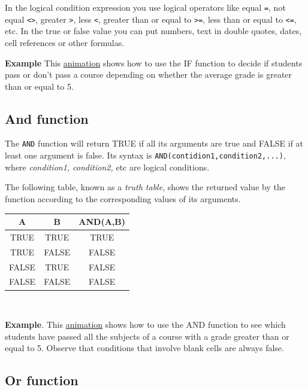 In the logical condition expression you use logical operators like equal \texttt{=}, not equal
\texttt{\textless{}\textgreater{}}, greater \texttt{\textgreater{}}, less \texttt{\textless{}}, greater than or equal to
\texttt{\textgreater{}=}, less than or equal to \texttt{\textless{}=}, etc. In the true or false value you can put
numbers, text in double quotes, dates, cell references or other formulas.

\textbf{Example} This \href{http://aprendeconalf.es/office/excel/manual/img/example_function_if.gif}{animation} shows how to use the IF function to decide if students pass or don't pass a course depending on whether the average grade is greater than or equal to 5.

\subsection{And function}\hypertarget{and-function}{}\label{and-function}

The \texttt{AND} function will return TRUE if all its arguments are true and FALSE if at least one argument is false. Its syntax is \texttt{AND(contidion1,condition2,...)}, where \emph{condition1, condition2,} etc are logical conditions.

The following table, known as a \emph{truth table}, shows the returned value by the function according to the corresponding values of its arguments.

\begin{longtable}{|c|c|c|}
\hline
A & B & AND(A,B)\\
\hline
TRUE & TRUE & TRUE\\
TRUE & FALSE & FALSE\\
FALSE & TRUE & FALSE\\
FALSE & FALSE & FALSE\\
\hline
\end{longtable}

~{}

\textbf{Example}. This \href{http://aprendeconalf.es/office/excel/manual/img/example_function_and.gif}{animation} shows how to use the AND function to see which students have passed all the subjects of a course with a grade greater than or equal to 5. Observe that conditions that involve blank cells are always false.

\subsection{Or function}\hypertarget{or-function}{}\label{or-function}

